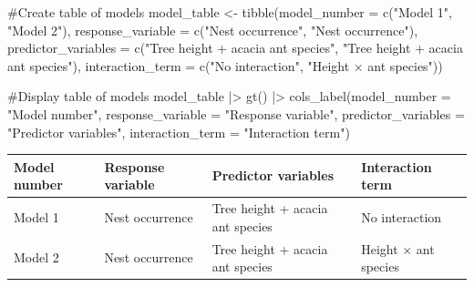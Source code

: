 \documentclass[
  letterpaper,
  DIV=11,
  numbers=noendperiod]{scrartcl}
\newenvironment{Shaded}{\begin{snugshade}}{\end{snugshade}}
\newcommand{\AttributeTok}[1]{\textcolor[rgb]{0.40,0.45,0.13}{#1}}
\newcommand{\CommentTok}[1]{\textcolor[rgb]{0.37,0.37,0.37}{#1}}
\newcommand{\FunctionTok}[1]{\textcolor[rgb]{0.28,0.35,0.67}{#1}}
\newcommand{\NormalTok}[1]{\textcolor[rgb]{0.00,0.23,0.31}{#1}}
\newcommand{\OtherTok}[1]{\textcolor[rgb]{0.00,0.23,0.31}{#1}}
\newcommand{\SpecialCharTok}[1]{\textcolor[rgb]{0.37,0.37,0.37}{#1}}
\newcommand{\StringTok}[1]{\textcolor[rgb]{0.13,0.47,0.30}{#1}}
\begin{document}
\begin{Shaded}
\begin{Highlighting}[]
\CommentTok{\#Create table of models}
\NormalTok{model\_table }\OtherTok{\textless{}{-}} \FunctionTok{tibble}\NormalTok{(}\AttributeTok{model\_number =} \FunctionTok{c}\NormalTok{(}\StringTok{"Model 1"}\NormalTok{,}
                                       \StringTok{"Model 2"}\NormalTok{),}
                      \AttributeTok{response\_variable =} \FunctionTok{c}\NormalTok{(}\StringTok{"Nest occurrence"}\NormalTok{,}
                                            \StringTok{"Nest occurrence"}\NormalTok{),}
                      \AttributeTok{predictor\_variables =} \FunctionTok{c}\NormalTok{(}\StringTok{"Tree height + acacia ant species"}\NormalTok{,}
                                              \StringTok{"Tree height + acacia ant species"}\NormalTok{),}
                      \AttributeTok{interaction\_term =} \FunctionTok{c}\NormalTok{(}\StringTok{"No interaction"}\NormalTok{,}
                                           \StringTok{"Height × ant species"}\NormalTok{))}

\CommentTok{\#Display table of models}
\NormalTok{model\_table }\SpecialCharTok{|\textgreater{}}
  \FunctionTok{gt}\NormalTok{() }\SpecialCharTok{|\textgreater{}}
  \FunctionTok{cols\_label}\NormalTok{(}\AttributeTok{model\_number =} \StringTok{"Model number"}\NormalTok{,}
             \AttributeTok{response\_variable =} \StringTok{"Response variable"}\NormalTok{,}
             \AttributeTok{predictor\_variables =} \StringTok{"Predictor variables"}\NormalTok{,}
             \AttributeTok{interaction\_term =} \StringTok{"Interaction term"}\NormalTok{)}
\end{Highlighting}
\end{Shaded}

\begin{table}
\fontsize{12.0pt}{14.0pt}\selectfont
\begin{tabular*}{\linewidth}{@{\extracolsep{\fill}}llll}
\toprule
Model number & Response variable & Predictor variables & Interaction term \\ 
\midrule\addlinespace[2.5pt]
Model 1 & Nest occurrence & Tree height + acacia ant species & No interaction \\ 
Model 2 & Nest occurrence & Tree height + acacia ant species & Height × ant species \\ 
\bottomrule
\end{tabular*}
\end{table}
\end{document}
